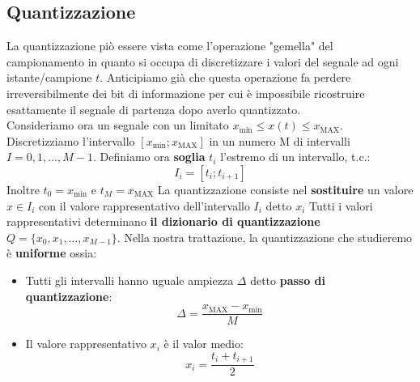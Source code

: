 \subsection{Quantizzazione}
La quantizzazione piò essere vista come l'operazione "gemella" del campionamento in quanto si occupa di discretizzare i valori
del segnale ad ogni istante/campione $t$. Anticipiamo già che questa operazione fa perdere irreversibilmente dei bit di informazione
per cui è impossibile ricostruire esattamente il segnale di partenza dopo averlo quantizzato.\\
Consideriamo ora un segnale con un limitato $x_{\text{min}}\leq x(t) \leq x_\text{MAX}$. Discretizziamo l'intervallo $\left[x_{\text{min}}; x_\text{MAX}\right]$ in
un numero M di intervalli $I = 0,1,\dots,M-1$. Definiamo ora \textbf{soglia} $t_i$ l'estremo di un intervallo, t.c.:
\begin{equation*}
    I_i = [t_i;t_{i+1}]
\end{equation*}
Inoltre $t_0 = x_\text{min}$ e $t_M = x_\text{MAX}$
La quantizzazione consiste nel \textbf{sostituire} un valore $x \in I_i$ con il valore rappresentativo dell'intervallo $I_i$ detto $x_i$
Tutti i valori rappresentativi determinano \textbf{il dizionario di quantizzazione } $Q = \{x_0,x_1,\dots,x_{M-1}\}$.
Nella nostra trattazione, la quantizzazione che studieremo è \textbf{uniforme} ossia:
\begin{itemize}
    \item Tutti gli intervalli hanno uguale ampiezza $\Delta$ detto \textbf{passo di quantizzazione}:
    \begin{equation}
        \Delta = \frac{x_\text{MAX} - x_\text{min}}{M}
    \end{equation}
    \item Il valore rappresentativo $x_i$ è il valor medio:
    \begin{equation}
        x_i = \frac{t_i + t_{i + 1}}{2}
    \end{equation}
\end{itemize}
\newpage
